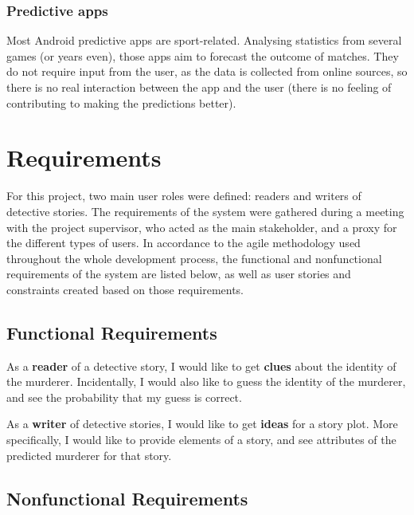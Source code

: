 \documentclass{mproj}
\begin{document}
\subsection{Predictive apps}

Most Android predictive apps are sport-related. Analysing statistics from several games (or years even), those apps aim to forecast the outcome of matches. 
They do not require input from the user, as the data is collected from online sources, so there is no real interaction between the app and the user (there is no feeling of contributing to making the predictions better).


\chapter{Requirements}

For this project, two main user roles were defined: readers and writers of detective stories. The requirements of the system were gathered during a meeting with the project supervisor, who acted as the main stakeholder, and a proxy for the different types of users. 
In accordance to the agile methodology used throughout the whole development process, the functional and nonfunctional requirements of the system are listed below, as well as user stories and constraints created based on those requirements.


\section{Functional Requirements}
	
As a \textbf{reader} of a detective story, I would like to get \textbf{clues} about the identity of the murderer. Incidentally, I would also like to guess the identity of the murderer, and see the probability that my guess is correct. \par

As a \textbf{writer} of detective stories, I would like to get \textbf{ideas} for a story plot. More specifically, I would like to provide elements of a story, and see attributes of the predicted murderer for that story.\par

\section{Nonfunctional Requirements}
	
\end{document}
